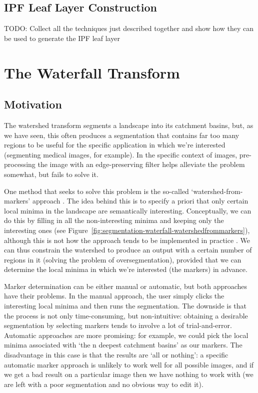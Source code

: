 \subsection{IPF Leaf Layer Construction}

TODO: Collect all the techniques just described together and show how they can be used to generate the IPF leaf layer

\section{The Waterfall Transform}

\subsection{Motivation}

The watershed transform segments a landscape into its catchment basins, but, as we have seen, this often produces a segmentation that contains far too many regions to be useful for the specific application in which we're interested (segmenting medical images, for example). In the specific context of images, pre-processing the image with an edge-preserving filter helps alleviate the problem somewhat, but fails to solve it.

One method that seeks to solve this problem is the so-called `watershed-from-markers' approach \cite{?}. The idea behind this is to specify a priori that only certain local minima in the landscape are semantically interesting. Conceptually, we can do this by filling in all the non-interesting minima and keeping only the interesting ones (see Figure~\ref{fig:segmentation-waterfall-watershedfrommarkers}), although this is not how the approach tends to be implemented in practice \cite{?}. We can thus constrain the watershed to produce an output with a certain number of regions in it (solving the problem of oversegmentation), provided that we can determine the local minima in which we're interested (the markers) in advance.

Marker determination can be either manual or automatic, but both approaches have their problems. In the manual approach, the user simply clicks the interesting local minima and then runs the segmentation. The downside is that the process is not only time-consuming, but non-intuitive: obtaining a desirable segmentation by selecting markers tends to involve a lot of trial-and-error. Automatic approaches are more promising: for example, we could pick the local minima associated with `the n deepest catchment basins' as our markers. The disadvantage in this case is that the results are `all or nothing': a specific automatic marker approach is unlikely to work well for all possible images, and if we get a bad result on a particular image then we have nothing to work with (we are left with a poor segmentation and no obvious way to edit it).

